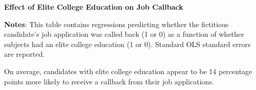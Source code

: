 \documentclass[11pt]{article}
\begin{document}
\begin{table}[htbp]
\caption{\textbf{Effect of Elite College Education on Job Callback}
\label{tab:EngApproach}}
\flushleft
	
    \flushleft
    \begin{footnotesize}
    \textbf{Notes}: This table contains regressions predicting whether the fictitious candidate's job application was called back (1 or 0) as a function of whether subjects had an elite college education (1 or 0). Standard OLS standard errors are reported.  
    \end{footnotesize}
\end{table}

On average, candidates with elite college education appear to be 14 percentage points more likely to receive a callback from their job applications.
\end{document}
